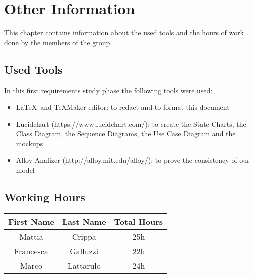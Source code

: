 \chapter{Other Information} \label{chap7}
This chapter contains information about the used tools and the hours of work done by the members of the group.

\section{Used Tools}
In this first requirements study phase the following tools were used:

\begin{itemize}
	\item \LaTeX\ and TeXMaker editor: to redact and to format this document
	\item Lucidchart (https://www.lucidchart.com/): to create the State Charts, the Class Diagram, the Sequence Diagrams, the Use Case Diagram and the mockups
	\item Alloy Analizer (http://alloy.mit.edu/alloy/): to prove the consistency of our model
\end{itemize}

\section{Working Hours}

\begin{table}[htbp]
\begin{center}
\begin{tabular}[t]{ccc}

\hline
\textbf{First Name} & \textbf{Last Name} & \textbf{Total Hours} \\
\hline
Mattia & Crippa &  25h\\
\hline
Francesca & Galluzzi &  22h\\
\hline
Marco & Lattarulo & 24h\\
\hline

\end{tabular}
\end{center}
\end{table}